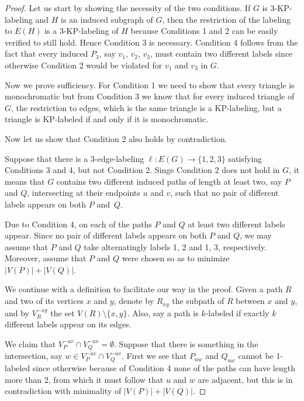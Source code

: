 \documentclass[12pt,a4paper,titlepage,openany]{report}
\begin{document}
\begin{proof}
Let us start by showing the necessity of the two conditions. If $G$ is 3-KP-labeling and $H$ is an induced subgraph of $G$, then the restriction of the labeling to $E(H)$ is a 3-KP-labeling of $H$ because Conditions 1 and 2 can be easily verified to still hold. Hence Condition 3 is necessary. Condition 4 follows from the fact that every induced $P_3$, say $v_1$, $v_2$, $v_3$, must contain two different labels since otherwise Condition 2 would be violated for $v_1$ and $v_3$ in $G$.

\medskip
Now we prove sufficiency. For Condition 1 we need to show that every triangle is monochromatic but from Condition 3 we know that for every induced triangle of $G$, the restriction to edges, which is the same triangle is a KP-labeling, but a triangle is KP-labeled if and only if it is monochromatic.

Now let us show that Condition 2 also holds by contradiction.

Suppose  that there is a 3-edge-labeling $\ell:E(G)\rightarrow \{1,2,3\}$ satisfying Conditions 3 and 4, but not Condition 2. Singe Condition 2 does not hold in $G$, it means that $G$ contains two different induced paths of length at least two, say $P$ and $Q$, intersecting at their endpoints $u$ and $v$, such that no pair of different labels appears on both $P$ and~$Q$.

Due to Condition 4, on each of the paths $P$ and $Q$ at least two different labels appear. Since no pair of different labels appears on both $P$ and $Q$, we may assume that $P$ and $Q$ take alternatingly labels 1, 2 and 1, 3, respectively. Moreover, assume that $P$ and $Q$ were chosen so as to minimize $|V(P)|+|V(Q)|$.

We continue with a definition to facilitate our way in the proof. Given a path $R$ and two of its vertices $x$ and $y$, denote by $R_{xy}$ the subpath of $R$ between
$x$ and $y$, and by $V_R^{-xy}$ the set $V(R)\setminus  \{x,y\}$. Also, say a path is $k$-labeled if exactly $k$
different labels appear on its edges.

We claim that $V_P^{-uv} \cap V_Q^{-uv} = \emptyset$. Suppose that there is something in the intersection, say $w\in V_P^{-uv} \cap V_Q^{-uv}$. First we see that $P_{uw}$ and $Q_{uw}$ cannot be 1-labeled since otherwise because of Condition 4 none of the paths can have length more than 2, from which it must follow that $u$ and $w$ are adjacent, but this is in contradiction with minimality of $|V(P)|+|V(Q)|$.


\end{proof}
\end{document}
